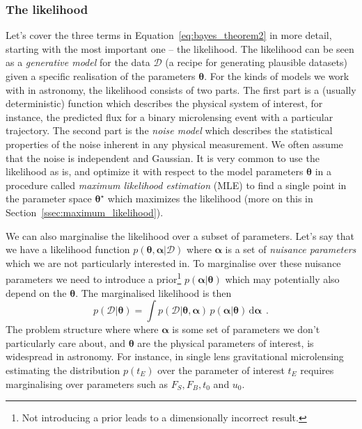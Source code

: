 \documentclass[12pt,dvipsnames]{report}
\newcommand{\ud}{\,\mathrm{d}}
\renewcommand{\vec}[1]{\boldsymbol{\mathbf{#1}}}
\newcommand{\hquad}{~~}
\begin{document}
\subsubsection{The likelihood}
Let's cover the three terms in Equation~\ref{eq:bayes_theorem2} in more detail, starting with the most
important one -- the likelihood. The likelihood can be seen as a \emph{generative model}
for the data $\mathcal{D}$ (a recipe for generating plausible datasets)
given a specific realisation of the parameters $\vec{\theta}$. 
For the kinds of models we work with in astronomy, the likelihood consists
of two parts.
The first part is a (usually deterministic) function which describes the physical
system of interest, for instance, the predicted flux for a binary
microlensing event with a particular trajectory. The second part is the
\emph{noise model} which describes the statistical properties of the noise
inherent in any physical measurement. We often assume that the noise is
independent and Gaussian. It is very common to use the likelihood as is, and
optimize it with respect to the model parameters $\vec{\theta}$ in a procedure
called \emph{maximum likelihood estimation} (MLE) to find a single point in the
parameter space $\vec{\theta}^\star$ which maximizes the likelihood (more on
this in Section~\ref{ssec:maximum_likelihood}).

We can also marginalise the likelihood over a subset of parameters. Let's say that we
have a likelihood function $p(\vec{\theta} ,\vec{\alpha}|\mathcal{D})$ where
$\vec{\alpha}$ is a set of \emph{nuisance parameters} which we are not
particularly interested in. To marginalise over these nuisance parameters we
need to introduce a prior\footnote{Not introducing a prior leads to a
    dimensionally incorrect result.} $p(\vec{\alpha}|\vec{\theta})$ which may
potentially also depend on the $\vec{\theta}$.
The marginalised likelihood is then
\begin{equation}
    p(\mathcal{D} | \vec{\theta})=\int p(\mathcal{D} | \vec{\theta}, \vec{\alpha})\,p(\vec{\alpha} |\vec{\theta}) \ud \vec{\alpha}
    \hquad.
\end{equation}
The problem structure where where $\vec{\alpha}$ is some set of parameters
we don't particularly care about, and $\vec{\theta}$ are the physical
parameters of interest, is widespread in astronomy. For instance, in single lens gravitational microlensing estimating
the distribution $p(t_E)$ over the parameter of interest $t_E$ requires marginalising over
parameters such as $F_S, F_B, t_0$ and $u_0$.
\end{document}
